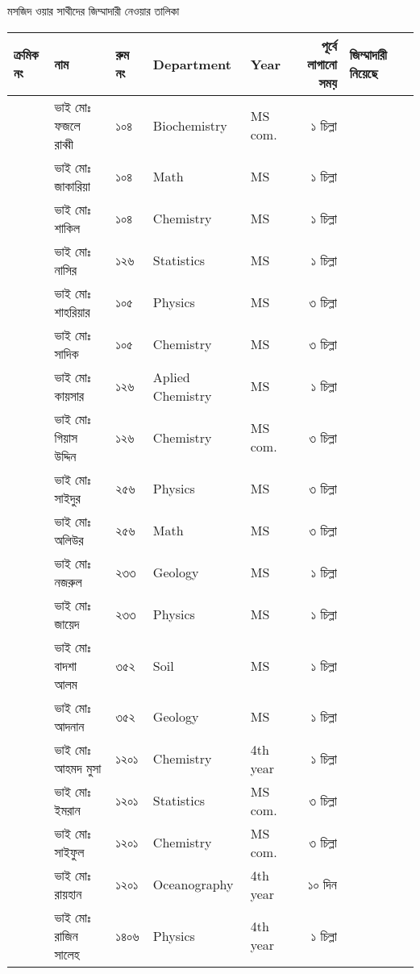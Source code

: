 \documentclass{article}
\newcounter{magicrownumbers}
\newcommand\rownumber{\stepcounter{magicrownumbers}\arabic{magicrownumbers}}
\begin{document}
\large
\begin{center}
মসজিদ ওয়ার সাথীদের জিম্মাদারী নেওয়ার তালিকা
\end{center}
\noindent
\centering
\noindent
  \begin{tabular}{@{}lll
>{\selectlanguage{english}}l
>{\selectlanguage{english}}l
    r|p{4.5cm}r@{}}
\toprule
ক্রমিক নং &  নাম &  রুম নং &  Department & Year & পূর্বে লাগানো সময় & জিম্মাদারী নিয়েছে \\
\toprule
\rownumber & ভাই মোঃ ফজলে রাব্বী  & ১০৪ & Biochemistry & MS com. & ১ চিল্লা \\ 
\hline
\rownumber & ভাই মোঃ জাকারিয়া & ১০৪ & Math & MS & ১ চিল্লা \\
\hline
\rownumber & ভাই মোঃ শাকিল & ১০৪ & Chemistry & MS & ১ চিল্লা\\
\hline
\rownumber & ভাই মোঃ নাসির & ১২৬ & Statistics & MS & ১ চিল্লা\\
\hline
\rownumber & ভাই মোঃ শাহরিয়ার & ১০৫ & Physics & MS & ৩ চিল্লা \\
\hline
\rownumber & ভাই মোঃ সাদিক & ১০৫ & Chemistry & MS & ৩ চিল্লা \\
\hline
\rownumber & ভাই মোঃ কায়সার & ১২৬ & Aplied Chemistry & MS & ১ চিল্লা \\ 
\hline
\rownumber & ভাই মোঃ গিয়াস উদ্দিন  & ১২৬ & Chemistry & MS com. & ৩ চিল্লা \\ 
\hline
\rownumber & ভাই মোঃ সাইদুর & ২৫৬ & Physics & MS & ৩ চিল্লা \\ 
\hline
\rownumber & ভাই মোঃ অলিউর & ২৫৬ & Math & MS & ৩ চিল্লা \\ 
\hline
\rownumber & ভাই মোঃ নজরুল  & ২৩৩ & Geology & MS & ১ চিল্লা \\
\hline
\rownumber & ভাই মোঃ জায়েদ & ২৩৩ & Physics & MS & ১ চিল্লা \\ 
\hline
\rownumber & ভাই মোঃ বাদশা আলম & ৩৫২ & Soil & MS & ১ চিল্লা \\
\hline
\rownumber & ভাই মোঃ আদনান & ৩৫২ & Geology & MS & ১ চিল্লা \\
\hline
\rownumber & ভাই মোঃ আহমদ মুসা & ১২০১ & Chemistry & 4th year & ১ চিল্লা \\ 
\hline
\rownumber & ভাই মোঃ ইমরান & ১২০১ & Statistics & MS com. & ৩ চিল্লা \\ 
\hline
\rownumber & ভাই মোঃ সাইফুল & ১২০১ & Chemistry & MS com. & ৩ চিল্লা \\ 
\hline
\rownumber & ভাই মোঃ রায়হান  & ১২০১ & Oceanography & 4th year & ১০ দিন \\
\hline
\rownumber & ভাই মোঃ রাজিন সালেহ & ১৪০৬ & Physics & 4th year & ১ চিল্লা \\ 

\end{tabular}
\end{document}

